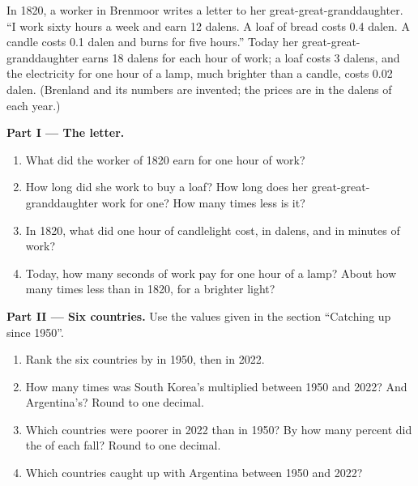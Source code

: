 \begin{problem}
\label{pb:g6:living-standards:1}
In 1820, a worker in Brenmoor writes a letter to her great-great-granddaughter.
``I work sixty hours a week and earn 12 dalens. A loaf of bread costs
0.4 dalen. A candle costs 0.1 dalen and burns for five hours.'' Today her
great-great-granddaughter earns 18 dalens for each hour of work; a loaf costs
3 dalens, and the electricity for one hour of a lamp, much brighter than a
candle, costs 0.02 dalen. (Brenland and its numbers are invented; the prices
are in the dalens of each year.)

\medskip
\noindent\textbf{Part I --- The letter.}
\begin{enumerate}
  \item What did the worker of 1820 earn for one hour of work?
  \item How long did she work to buy a loaf? How long does her
        great-great-granddaughter work for one? How many times less is it?
  \item In 1820, what did one hour of candlelight cost, in dalens, and in
        minutes of work?
  \item Today, how many seconds of work pay for one hour of a lamp? About how
        many times less than in 1820, for a brighter light?
\end{enumerate}

\medskip
\noindent\textbf{Part II --- Six countries.} Use the values given in the
section ``Catching up since 1950''.
\begin{enumerate}[resume]
  \item Rank the six countries by  in 1950, then in 2022.
  \item How many times was South Korea's  multiplied between
        1950 and 2022? And Argentina's? Round to one decimal.
  \item Which countries were poorer in 2022 than in 1950? By how many percent
        did the  of each fall? Round to one decimal.
  \item Which countries caught up with Argentina between 1950 and 2022?
\end{enumerate}


\end{problem}
